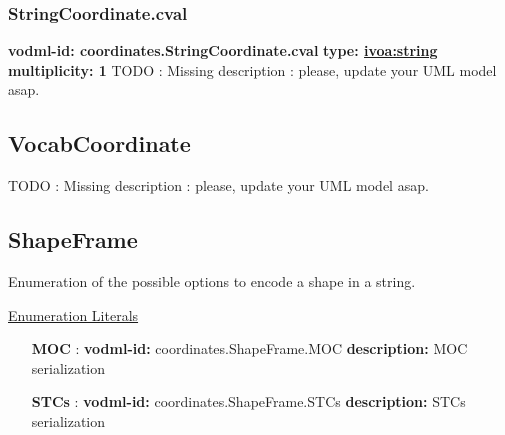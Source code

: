     \subsubsection{StringCoordinate.cval}
      \textbf{vodml-id: coordinates.StringCoordinate.cval} \newline
      \textbf{type: \hyperref[sect:ivoa]{ivoa:string}} \newline
      \textbf{multiplicity: 1} \newline 
      TODO : Missing description : please, update your UML model asap.

  \subsection{VocabCoordinate}
  \label{sect:coordinates.VocabCoordinate}
  TODO : Missing description : please, update your UML model asap.

  \subsection{ShapeFrame}
  \label{sect:coordinates.ShapeFrame}

  Enumeration of the possible options to encode a shape in a string.

  \noindent \underline{Enumeration Literals}
  \vspace{-\parsep}
  \small
  \begin{itemize}
  
    \item[\textbf{MOC}]: \textbf{vodml-id:} coordinates.ShapeFrame.MOC \newline
          \textbf{description:} MOC serialization
    \item[\textbf{STCs}]: \textbf{vodml-id:} coordinates.ShapeFrame.STCs \newline
          \textbf{description:} STCs serialization
  \end{itemize}
  \normalsize
